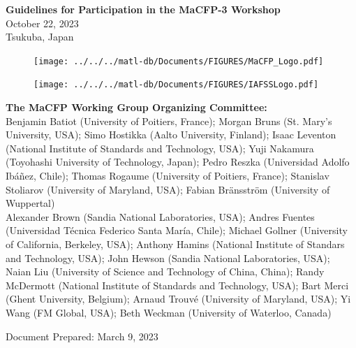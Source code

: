 \documentclass[12pt]{article}
\begin{document}

\thispagestyle{empty}

\begin{center}
{\bf\Large Guidelines for Participation in the MaCFP-3 Workshop} \\
{\large October 22, 2023\\Tsukuba, Japan}
\end{center}

\begin{figure}[h]
  \centering
  \texttt{[image: ../../../matl-db/Documents/FIGURES/MaCFP\_Logo.pdf]}
  \label{Cover_Image}
\end{figure}

\vfill

\begin{minipage}{0.25\textwidth}
\begin{figure}[H]
\texttt{[image: ../../../matl-db/Documents/FIGURES/IAFSSLogo.pdf]}
\end{figure}
\end{minipage} \hfill
\begin{minipage}{0.65\textwidth}
\begin{flushright}
\begin{small}
{\bf The MaCFP Working Group Organizing Committee:} \\
{\footnotesize Benjamin Batiot (University of Poitiers, France); Morgan Bruns (St. Mary's University, USA); Simo Hostikka (Aalto University, Finland); Isaac Leventon (National Institute of Standards and Technology, USA); Yuji Nakamura (Toyohashi University of Technology, Japan); Pedro Reszka (Universidad Adolfo Ibáñez, Chile); Thomas Rogaume (University of Poitiers, France); Stanislav Stoliarov (University of Maryland, USA); Fabian Bränsström (University of Wuppertal)}\\
{\footnotesize Alexander Brown (Sandia National Laboratories, USA); Andres Fuentes (Universidad Técnica Federico Santa María, Chile); Michael Gollner (University of California, Berkeley, USA); Anthony Hamins (National Institute of Standars and Technology, USA); John Hewson (Sandia National Laboratories, USA); Naian Liu (University of Science and Technology of China, China); Randy McDermott (National Institute of Standards and Technology, USA); Bart Merci (Ghent University, Belgium); Arnaud Trouvé (University of Maryland, USA); Yi Wang (FM Global, USA); Beth Weckman (University of Waterloo, Canada)}


\end{small}
\end{flushright}
\end{minipage}
\begin{small}
Document Prepared: March 9, 2023\\
\end{small}
\newpage
\thispagestyle{empty}
\tableofcontents
\end{document}
